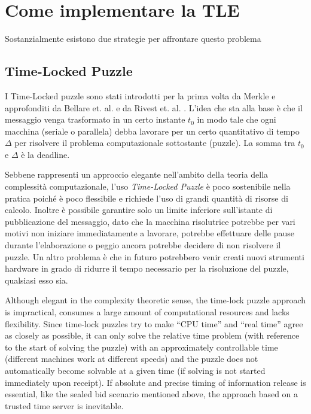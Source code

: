 \section{Come implementare la TLE}
Sostanzialmente esistono due strategie
per affrontare questo problema

\subsection{Time-Locked Puzzle}
I Time-Locked puzzle sono stati introdotti per la prima volta
da Merkle \cite{Merkle:1978:SCO:359460.359473} e approfonditi
da Bellare et. al. \cite{Bellare:1996:EKE:888619}
e da Rivest et. al. \cite{Rivest96time-lockpuzzles}.
L'idea che sta alla base è che il messaggio venga trasformato in un certo instante $ t_0 $
in modo tale che ogni macchina
(seriale o parallela) debba lavorare per un certo quantitativo di tempo $ \Delta $ per risolvere
il problema computazionale sottostante (puzzle). La somma tra $ t_0 $ e $ \Delta $ è la deadline.


Sebbene rappresenti un approccio elegante nell'ambito della teoria della complessità computazionale,
l'uso \textit{Time-Locked Puzzle} è poco sostenibile nella pratica poiché è poco flessibile e richiede l'uso di
grandi quantità di risorse di calcolo. Inoltre è possibile garantire solo un limite inferiore
sull'istante di pubblicazione del messaggio, dato che la macchina risolutrice potrebbe per vari motivi
non iniziare immediatamente
a lavorare, potrebbe effettuare delle pause durante l'elaborazione
o peggio ancora potrebbe decidere di non risolvere il puzzle.
Un altro problema è che in futuro potrebbero venir creati nuovi strumenti hardware in grado
di ridurre il tempo necessario per la risoluzione del puzzle, qualsiasi esso sia.


Although elegant in the complexity theoretic sense, the time-lock puzzle approach is impractical,
consumes a large amount of computational resources and lacks flexibility. Since
time-lock puzzles try to make “CPU time” and “real time” agree as closely as possible, it can
only solve the relative time problem (with reference to the start of solving the puzzle) with an
approximately controllable time (different machines work at different speeds) and the puzzle
does not automatically become solvable at a given time (if solving is not started immediately
upon receipt). If absolute and precise timing of information release is essential, like the sealed
bid scenario mentioned above, the approach based on a trusted time server is inevitable.

